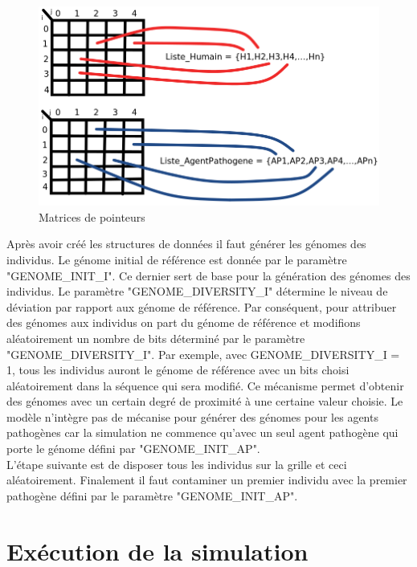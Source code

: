\begin{figure}[h]
\centering
\captionsetup{justification=centering}
\includegraphics[scale=0.4]{Images/MatricesPointeurs.png}
\caption{Matrices de pointeurs}
\end{figure}

Après avoir créé les structures de données il faut générer les génomes des individus. Le génome initial de référence est donnée par le paramètre "GENOME\_INIT\_I". Ce dernier sert de base pour la génération des génomes des individus. Le paramètre "GENOME\_DIVERSITY\_I" détermine le niveau de déviation par rapport aux génome de référence. Par conséquent, pour attribuer des génomes aux individus on part du génome de référence et modifions aléatoirement un nombre de bits déterminé par le paramètre "GENOME\_DIVERSITY\_I". Par exemple, avec GENOME\_DIVERSITY\_I = 1, tous les individus auront le génome de référence avec un bits choisi aléatoirement dans la séquence qui sera modifié. Ce mécanisme permet d'obtenir des génomes avec un certain degré de proximité à une certaine valeur choisie. Le modèle n'intègre pas de mécanise pour générer des génomes pour les agents pathogènes car la simulation ne commence qu'avec un seul agent pathogène qui porte le génome défini par "GENOME\_INIT\_AP".\\

L'étape suivante est de disposer tous les individus sur la grille et ceci aléatoirement. Finalement il faut contaminer un premier individu avec la premier pathogène défini par le paramètre "GENOME\_INIT\_AP". 

\section{Exécution de la simulation}

